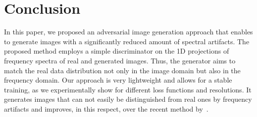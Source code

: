 \documentclass[letterpaper]{article} %
\begin{document}
\section{Conclusion}
\label{sec:conclusion}
In this paper, we proposed an adversarial image generation approach that enables to generate images with a significantly reduced amount of spectral artifacts. The proposed method employs a simple discriminator on the 1D projections of frequency spectra of real and generated images. Thus, the generator aims to match the real data distribution not only in the image domain but also in the frequency domain. Our approach is very lightweight and allows for a stable training, as we experimentally show for different loss functions and resolutions. It generates images that can not easily be distinguished from real ones by frequency artifacts and improves, in this respect, over the recent method by~\cite{margret2020upconvolution}.
\end{document}
